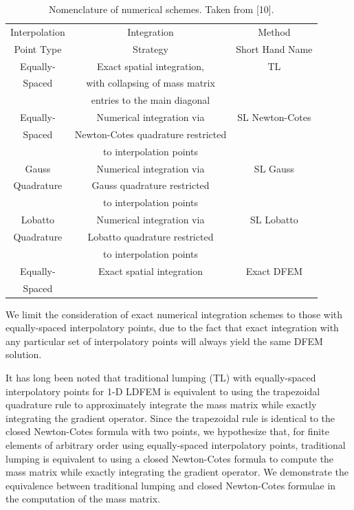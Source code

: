 \begin{table}[!htp]
\centering
\caption{Nomenclature of numerical schemes.  Taken from [10].}
\begin{tabular}{|c|c|c|} 
\hline
  Interpolation &    		Integration			&		Method					\\
  Point Type		&		    Strategy 	    	&		Short Hand Name \\
  \hline
  Equally-  & Exact spatial integration,				& 		TL \\
  Spaced  &  with collapsing of  mass matrix   	&   {}  			\\
  {}			&			entries to the main diagonal		& 	{}				\\
  \hline
  Equally-  & Numerical integration via	  				& SL Newton-Cotes \\
  Spaced   	& Newton-Cotes quadrature	restricted 	& 	{}						\\
  {}				&	to interpolation points							&		{}     				\\
  \hline
  Gauss  			&  	Numerical integration via	  	& SL Gauss 	\\
  Quadrature 	& 	Gauss	quadrature	restricted	&  	{}			\\
    {}				&		to interpolation points  			&    {}  		\\
  \hline
  Lobatto  		& Numerical integration via 			& SL Lobatto \\
  Quadrature 	& Lobatto	quadrature	restricted 	&   {} \\
    {}				&		to interpolation points				&		{}      \\
  \hline
    Equally-  & 		Exact spatial integration 		& Exact DFEM \\
  Spaced   &   		{}											  		&             \\
  \hline
\end{tabular}
\label{tbl:names} 
\end{table}
We limit the consideration of exact numerical integration schemes to those with equally-spaced interpolatory points, due to the fact that 
exact integration with any particular set of interpolatory points will always yield the same DFEM solution.  

It has long been noted that traditional lumping (TL) with equally-spaced interpolatory points for 1-D LDFEM is equivalent to using the trapezoidal quadrature rule to approximately integrate the mass matrix \cite{thomee} while exactly integrating the gradient operator.  
Since the trapezoidal rule is identical to the closed Newton-Cotes formula with two points, we hypothesize that, for finite elements of arbitrary  order using equally-spaced interpolatory points, traditional lumping is  equivalent to using a closed Newton-Cotes formula to compute the mass matrix while exactly integrating  the gradient operator.  
We demonstrate the equivalence between traditional lumping and closed Newton-Cotes formulae in the computation of the mass matrix.

